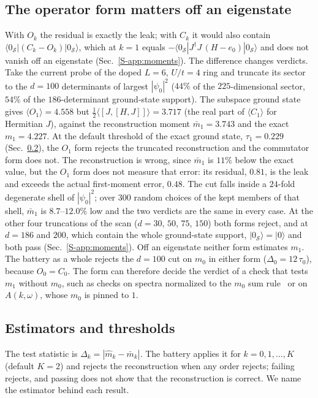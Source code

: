 \documentclass[aps,prb,reprint,onecolumn,12pt,superscriptaddress,longbibliography,floatfix]{revtex4-2}
\begin{document}
\subsection{The operator form matters off an eigenstate}
\label{sec:form}
With $O_k$ the residual is exactly the leak; with $C_k$ it would also contain $\langle 0_\mathcal{S}|(C_k-O_k)|0_\mathcal{S}\rangle$, which at $k=1$ equals $-\langle 0_\mathcal S|J^\dagger J\,(H-e_0)|0_\mathcal S\rangle$ and does not vanish off an eigenstate (Sec.~\ref{S-app:moments}). The difference changes verdicts. Take the current probe of the doped $L=6$, $U/t=4$ ring and truncate its sector to the $d=100$ determinants of largest $|\psi_0|^2$ ($44\%$ of the $225$-dimensional sector, $54\%$ of the $186$-determinant ground-state support). The subspace ground state gives $\langle O_1\rangle=4.558$ but $\tfrac12\langle[J,[H,J]]\rangle=3.717$ (the real part of $\langle C_1\rangle$ for Hermitian $J$), against the reconstruction moment $\bar m_1=3.743$ and the exact $m_1=4.227$. At the default threshold of the exact ground state, $\tau_1=0.229$ (Sec.~\ref{sec:estimator}), the $O_1$ form rejects the truncated reconstruction and the commutator form does not. The reconstruction is wrong, since $\bar m_1$ is $11\%$ below the exact value, but the $O_1$ form does not measure that error: its residual, $0.81$, is the leak and exceeds the actual first-moment error, $0.48$. The cut falls inside a $24$-fold degenerate shell of $|\psi_0|^2$; over $300$ random choices of the kept members of that shell, $\bar m_1$ is $8.7$--$12.0\%$ low and the two verdicts are the same in every case. At the other four truncations of the scan ($d=30$, $50$, $75$, $150$) both forms reject, and at $d=186$ and $200$, which contain the whole ground-state support, $|0_\mathcal S\rangle=|0\rangle$ and both pass (Sec.~\ref{S-app:moments}). Off an eigenstate neither form estimates $m_1$. The battery as a whole rejects the $d=100$ cut on $m_0$ in either form ($\Delta_0=12\,\tau_0$), because $O_0=C_0$. The form can therefore decide the verdict of a check that tests $m_1$ without $m_0$, such as checks on spectra normalized to the $m_0$ sum rule~\cite{RoggeroCarlson2019} or on $A(k,\omega)$, whose $m_0$ is pinned to $1$.

\subsection{Estimators and thresholds}
\label{sec:estimator}
The test statistic is $\Delta_k=|\widehat m_k-\bar m_k|$. The battery applies it for $k=0,1,\dots,K$ (default $K=2$) and rejects the reconstruction when any order rejects; failing rejects, and passing does not show that the reconstruction is correct. We name the estimator behind each result.
\end{document}
